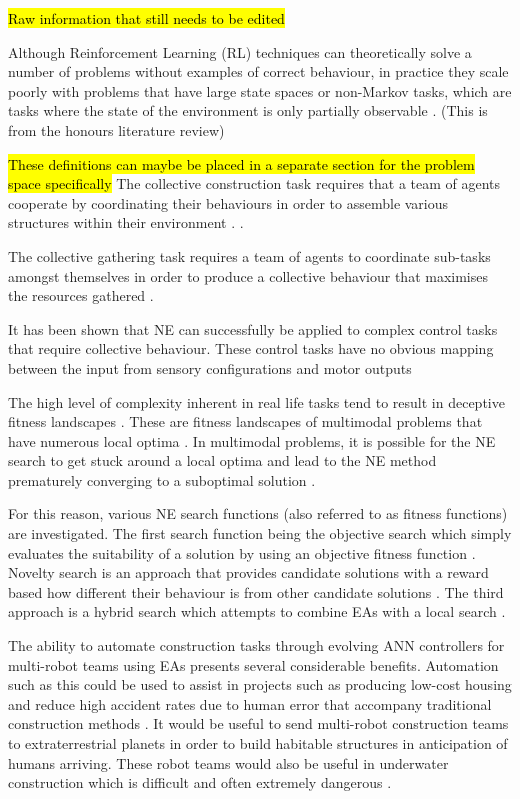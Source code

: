 \documentclass[conference]{IEEEtran}
\begin{document}
\hl{Raw information that still needs to be edited}

Although Reinforcement Learning (RL) techniques can theoretically solve a number of problems without examples of correct behaviour, in practice they scale poorly with problems that have large state spaces or non-Markov tasks, which are tasks where the state of the environment is only partially observable \cite{RefWorks:32}. (This is from the honours literature review)

\hl{These definitions can maybe be placed in a separate section for the problem space specifically}
The collective construction task requires that a team of agents cooperate by coordinating their behaviours in order to assemble various structures within their environment \cite{RefWorks:15}. \cite{NitschkeSaEC2012}.

The collective gathering task requires a team of agents to coordinate sub-tasks amongst themselves in order to produce a collective behaviour that maximises the resources gathered \cite{RefWorks:15}.

It has been shown that NE can successfully be applied to complex control tasks that require collective behaviour. These control tasks have no obvious mapping between the input from sensory configurations and motor outputs \cite{RefWorks:15}

The high level of complexity inherent in real life tasks tend to result in deceptive fitness landscapes \cite{RefWorks:11}. These are fitness landscapes of multimodal problems that have numerous local optima \cite{RefWorks:33}. In multimodal problems, it is possible for the NE search to get stuck around a local optima and lead to the NE method prematurely converging to a suboptimal solution \cite{RefWorks:11}.

For this reason, various NE search functions (also referred to as fitness functions) are investigated. The first search function being the objective search which simply evaluates the suitability of a solution by using an objective fitness function \cite{lehman2011abandoning}.
Novelty search is an approach that provides candidate solutions with a reward based how different their behaviour is from other candidate solutions \cite{RefWorks:11}. The third approach is a hybrid search which attempts to combine EAs with a local search \cite{Castillo2007}.

The ability to automate construction tasks through evolving ANN controllers for multi-robot teams using EAs presents several considerable benefits. Automation such as this could be used to assist in projects such as producing low-cost housing and reduce high accident rates due to human error that accompany traditional construction methods \cite{Khoshnevis2003}. It would be useful to send multi-robot construction teams to extraterrestrial planets in order to build habitable structures in anticipation of humans arriving. These robot teams would also be useful in underwater construction which is difficult and often extremely dangerous \cite{RefWorks:30}.
\end{document}
